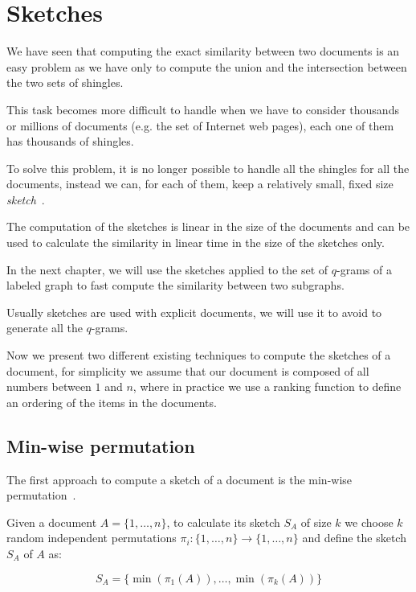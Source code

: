 \section{Sketches}

We have seen that computing the exact similarity between two documents is an easy problem
as we have only to compute the union and the intersection between the two sets of shingles.\medskip

This task becomes more difficult to handle when we have to consider thousands or millions of documents
(e.g. the set of Internet web pages), each one of them has thousands of shingles.\medskip

To solve this problem, it is no longer possible to handle all the shingles for all the documents, 
instead we can, for each of them, keep a relatively small, fixed size \textit{sketch}~\cite{Broder2000}.

The computation of the sketches is linear in the size of the documents and can be used to calculate the similarity in linear time in the size of the sketches only.\medskip

In the next chapter, we will use the sketches applied to the set of $q$-grams of a labeled graph to fast compute the similarity between two subgraphs.\medskip

Usually sketches are used with explicit documents, we will use it to avoid to generate all the $q$-grams.\bigskip

Now we present two different existing techniques to compute the sketches of a document, 
for simplicity we assume that our document is composed of all numbers between $1$ and $n$, where in practice we use a ranking function to define an ordering of the items in the documents.

\subsection*{Min-wise permutation}

The first approach to compute a sketch of a document is the min-wise permutation~\cite{Broder:1998:MIP:276698.276781}.\bigskip

Given a document $A = \{1, \ldots, n\}$, to calculate its sketch $S_{A}$ of size $k$ 
we choose $k$ random independent permutations $\pi_{i} : \{1, \ldots, n\} \rightarrow \{1, \ldots, n\}$ and define the sketch $S_A$ of $A$ as:

\begin{equation}
S_{A} = \{ \min(\pi_{1}(A)), \ldots, \min(\pi_{k}(A)) \}
\end{equation}

